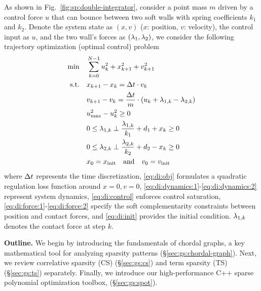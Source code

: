 \begin{example}
	\label{exa:gs:di-soft-wall}
    As shown in Fig.~\ref{fig:sp:double-integrator}, consider a point mass $m$ driven by a control force $u$ that can bounce between two soft walls with spring coefficients $k_1$ and $k_2$. Denote the system state as $(x, v)$ ($x$: position, $v$: velocity), the control input as $u$, and the two wall's forces as $(\lam{1}, \lam{2})$, we consider the following trajectory optimization (optimal control) problem
    \begin{subequations}
        \begin{align}
            \min \quad & \sum_{k = 0} ^ {N - 1} u_k^2 + \x[k+1]^2 + v_{k+1}^2 \label{eq:di:obj}\\
            \text{s.t.} \quad & \x[k+1] - \x[k] = \dt \cdot v_k \label{eq:di:dynamics:1}\\
            & v_{k+1} - v_k = \frac{\dt}{m} \cdot (u_k + \lam{1}[k] - \lam{2}[k]) \label{eq:di:dynamics:2} \\
            & u_{\max}^2 - u_k^2 \ge 0 \label{eq:di:control}\\
            & 0 \le \lam{1}[k] \perp \frac{\lam{1}[k] }{k_1} + d_1 + \x[k] \ge 0 \label{eq:di:force:1}\\
            & 0 \le \lam{2}[k] \perp \frac{\lam{2}[k] }{k_2} + d_2 - \x[k] \ge 0 \label{eq:di:force:2} \\
            & x_0 = x_{\init} \quad \text{and} \quad v_0 = v_{\init} \label{eq:di:init}
        \end{align} 
    \end{subequations}
where $\Delta t$ represents the time discretization, \eqref{eq:di:obj} formulates a quadratic regulation loss function around $x=0,v=0$, \eqref{eq:di:dynamics:1}-\eqref{eq:di:dynamics:2} represent system dynamics, \eqref{eq:di:control} enforces control saturation, \eqref{eq:di:force:1}-\eqref{eq:di:force:2} specify the soft complementarity constraints between position and contact forces, and \eqref{eq:di:init} provides the initial condition. $\lam{1}[k]$ denotes the contact force at step $k$.
\end{example}

\textbf{Outline.} We begin by introducing the fundamentals of chordal graphs, a key mathematical tool for analyzing sparsity patterns (\S\ref{sec:gs:chordal-graph}). Next, we review correlative sparsity (CS) (\S\ref{sec:gs:cs}) and term sparsity (TS) (\S\ref{sec:gs:ts}) separately. Finally, we introduce our high-performance C++ sparse polynomial optimization toolbox, \spot (\S\ref{sec:gs:spot}). 

